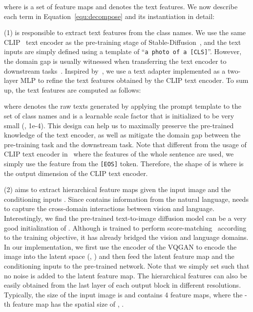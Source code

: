 \documentclass[10pt,twocolumn,letterpaper]{article}
\begin{document}
where  is a set of feature maps and  denotes the text features. We now describe each term in Equation~\eqref{equ:decompose} and its instantiation in detail: 

\noindent (1) \underline{} is responsible to extract text features from the class names. We use the same CLIP~\cite{radford2021clip} text encoder as the pre-training stage of Stable-Diffusion~\cite{rombach2022high}, and the text inputs are simply defined using a template of ``\texttt{a photo of a [CLS]}''. However, the domain gap is usually witnessed when transferring the text encoder to downstream tasks~\cite{zhou2022coop,gao2021clipadapter}. Inspired by~\cite{gao2021clipadapter}, we use a text adapter implemented as a two-layer MLP to refine the text features obtained by the CLIP text encoder. To sum up, the text features are computed as follows:

where  denotes the raw texts generated by applying the prompt template to the set of class names and  is a learnable scale factor that is initialized to be very small (\eg, 1e-4). This design can help us to maximally preserve the pre-trained knowledge of the text encoder, as well as mitigate the domain gap between the pre-training task and the downstream task. Note that different from the usage of CLIP text encoder in~\cite{rombach2022high} where the features of the whole sentence are used, we simply use the feature from the \texttt{[EOS]} token. Therefore, the shape of  is  where  is the output dimension of the CLIP text encoder. 

\noindent(2) \underline{} aims to extract hierarchical feature maps  given the input image  and the conditioning inputs . Since  contains information from the natural language,  needs to capture the cross-domain interactions between vision and language. Interestingly, we find the pre-trained text-to-image diffusion model can be a very good initialization of . Although  is trained to perform score-matching~\cite{song2021score} according to the training objective, it has already bridged the vision and language domains. In our implementation, we first use the encoder of the VQGAN  to encode the image into the latent space (\eg, ) and then feed the latent feature map and the conditioning inputs to the pre-trained  network. Note that we simply set  such that no noise is added to the latent feature map. The hierarchical features  can also be easily obtained from the last layer of each output block in different resolutions. Typically, the size of the input image is  and  contains 4 feature maps, where the -th feature map  has the spatial size of , .
\end{document}
